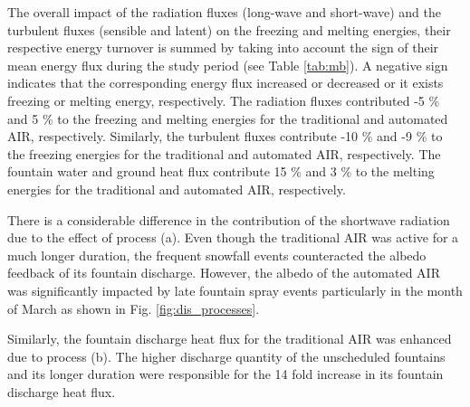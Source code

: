 \documentclass[tc, manuscript]{copernicus}
\begin{document}
The overall impact of the radiation fluxes (long-wave and short-wave) and the turbulent fluxes (sensible and
latent) on the freezing and melting energies, their respective energy turnover is summed by taking into account
the sign of their mean energy flux during the study period (see Table \ref{tab:mb}). A negative sign indicates
that the corresponding energy flux increased or decreased or it exists freezing or melting energy, respectively.
The radiation fluxes contributed -5 \% and 5 \% to the freezing and melting energies for the traditional and
automated AIR, respectively.  Similarly, the turbulent fluxes contribute -10 \% and -9 \% to the freezing
energies for the traditional and automated AIR, respectively. The fountain water and ground heat flux contribute
15 \% and 3 \% to the melting energies for the traditional and automated AIR, respectively. 

There is a considerable difference in the contribution of the shortwave radiation due to the effect of process
(a). Even though the traditional AIR was active for a much longer duration, the frequent snowfall events
counteracted the albedo feedback of its fountain discharge. However, the albedo of the automated AIR was
significantly impacted by late fountain spray events particularly in the month of March as shown in Fig.
\ref{fig:dis_processes}.

Similarly, the fountain discharge heat flux for the traditional AIR was enhanced due to process (b). The higher
discharge quantity of the unscheduled fountains and its longer duration were responsible for the 14 fold
increase in its fountain discharge heat flux.
\end{document}
